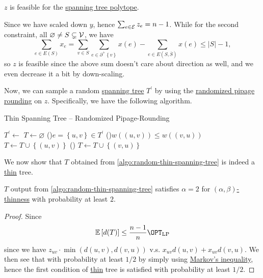\begin{remark}
	\(z\) is feasible for the \hyperref[eq:lec10-1]{spanning tree polytope}.
\end{remark}
\begin{explanation}
	Since we have scaled down \(y\), hence \(\sum_{e\in \mathcal{\MakeUppercase{e}} } z_e = n-1\). While for the second constraint, all \(\varnothing \neq S \subsetneq \mathcal{\MakeUppercase{v}} \), we have
	\[
		\sum_{e\in E(S)} x_e = \sum_{v\in S} \sum_{e\in \partial ^+ \left\{ v \right\} } x(e) - \sum_{e\in E(S, \overline{S} )} x(e) \leq \left\vert S \right\vert - 1,
	\]
	so \(z\) is feasible since the above sum doesn't care about direction as well, and we even decrease it a bit by down-scaling.
\end{explanation}

Now, we can sample a random \hyperref[def:spanning-tree]{spanning tree} \(T^\prime \) by using the \hyperref[algo:min-spanning-tree-randomized-pipage-rounding]{randomized pipage rounding} on \(z\). Specifically, we have the following algorithm.

\begin{algorithm}[H]\label{algo:random-thin-spanning-tree}
	\DontPrintSemicolon
	\caption{Thin Spanning Tree -- Randomized Pipage-Rounding}
	\BlankLine
	\(T^\prime \gets\)\;
	\(T\gets \varnothing \)\;
	\For(){\(e=\left\{ u, v \right\} \in T^\prime \)}{
		\uIf(){\(w((u, v)) \leq w((v, u))\)}{
			\(T\gets T \cup \left\{ (u, v) \right\} \)\;
		}
		\Else(){
			\(T\gets T \cup \left\{ (v, u) \right\} \)\;
		}
	}
	\;
\end{algorithm}

We now show that \(T\) obtained from \autoref{algo:random-thin-spanning-tree} is indeed a \hyperref[def:thin]{thin} tree.

\begin{lemma}\label{lma:lec12-1}
	\(T\) output from \autoref{algo:random-thin-spanning-tree} satisfies \(\alpha =2\) for \hyperref[def:thin]{\((\alpha , \beta )\)-thinness} with probability at least \(2\).
\end{lemma}
\begin{proof}
	Since
	\[
		\mathbb{E}\left[d(T) \right] \leq \frac{n-1}{n}\OPT_{\mathrm{LP} }
	\]
	since we have \(z_{uv}\cdot \min (d(u, v), d(v, u))\) v.s. \(x_{uv} d(u, v) + x_{uv} d(v, u)\). We then see that with probability at least \(1 / 2\) by simply using \href{https://en.wikipedia.org/wiki/Markov%27s_inequality}{Markov's inequality}, hence the first condition of \hyperref[def:thin]{thin} tree is satisfied with probability at least \(1 / 2\).
\end{proof}

